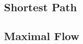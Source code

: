 \subsection{Shortest Path}\label{sec:ad:shortestpath}


\subsection{Maximal Flow}\label{sec:ad:maximalflow}

%
%
%
%
%
%
%
